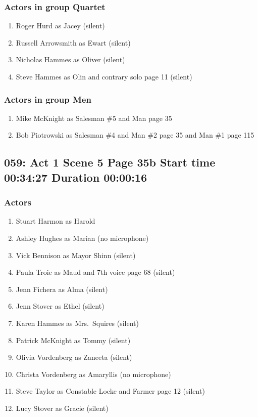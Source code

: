 \subsubsection{Actors in group Quartet}
\begin{enumerate}
\item Roger Hurd as Jacey (silent)
\item Russell Arrowsmith as Ewart (silent)
\item Nicholas Hammes as Oliver (silent)
\item Steve Hammes as Olin and contrary solo page 11 (silent)
\end{enumerate}
\subsubsection{Actors in group Men}
\begin{enumerate}
\item Mike McKnight as Salesman \#5 and Man page 35
\item Bob Piotrowski as Salesman \#4 and Man \#2 page 35 and Man \#1 page 115
\end{enumerate}


\subsection{059: Act 1 Scene 5 Page 35b Start time 00:34:27 Duration 00:00:16}

\subsubsection{Actors}
\begin{enumerate}
\item Stuart Harmon as Harold
\item Ashley Hughes as Marian (no microphone)
\item Vick Bennison as Mayor Shinn (silent)
\item Paula Troie as Maud and 7th voice page 68 (silent)
\item Jenn Fichera as Alma (silent)
\item Jenn Stover as Ethel (silent)
\item Karen Hammes as Mrs.~Squires (silent)
\item Patrick McKnight as Tommy (silent)
\item Olivia Vordenberg as Zaneeta (silent)
\item Christa Vordenberg as Amaryllis (no microphone)
\item Steve Taylor as Constable Locke and Farmer page 12 (silent)
\item Lucy Stover as Gracie (silent)
\end{enumerate}
